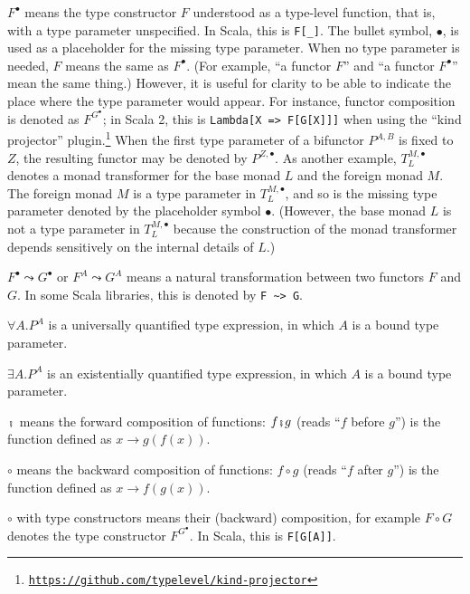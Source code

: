 $F^{\bullet}$ means the type constructor $F$ understood as a type-level
function, \textemdash{} that is, with a type parameter unspecified.
In Scala, this is \lstinline!F[_]!. The bullet symbol, $\bullet$,
is used as a placeholder for the missing type parameter. When no type
parameter is needed, $F$ means the same as $F^{\bullet}$. (For example,
``a functor $F$'' and ``a functor $F^{\bullet}$'' mean the same
thing.) However, it is useful for clarity to be able to indicate the
place where the type parameter would appear. For instance, functor
composition is denoted as $F^{G^{\bullet}}$; in Scala 2, this is
\texttt{}\lstinline!Lambda[X => F[G[X]]]! when using the ``kind
projector'' plugin.\footnote{\texttt{\href{https://github.com/typelevel/kind-projector}{https://github.com/typelevel/kind-projector}}}
When the first type parameter of a bifunctor $P^{A,B}$ is fixed to
$Z$, the resulting functor may be denoted by $P^{Z,\bullet}$. As
another example, $T_{L}^{M,\bullet}$ denotes a monad transformer
for the base monad $L$ and the foreign monad $M$. The foreign monad
$M$ is a type parameter in $T_{L}^{M,\bullet}$, and so is the missing
type parameter denoted by the placeholder symbol $\bullet$. (However,
the base monad $L$ is not a type parameter in $T_{L}^{M,\bullet}$
because the construction of the monad transformer depends sensitively
on the internal details of $L$.)

$F^{\bullet}\leadsto G^{\bullet}$ or $F^{A}\leadsto G^{A}$ means
a natural transformation between two functors $F$ and $G$. In some
Scala libraries, this is denoted by \lstinline!F ~> G!.

$\forall A.P^{A}$ is a universally quantified type expression, in
which $A$ is a bound type parameter.

$\exists A.P^{A}$ is an existentially quantified type expression,
in which $A$ is a bound type parameter.

$\bef$ means the forward composition
of functions: $f\bef g$ (reads ``$f$ before $g$'') is the function
defined as $x\rightarrow g(f(x))$.

$\circ$ means the backward composition
of functions: $f\circ g$ (reads ``$f$ after $g$'') is the function
defined as $x\rightarrow f(g(x))$.

$\circ$ with type constructors means their (backward) composition,
for example $F\circ G$ denotes the type constructor $F^{G^{\bullet}}$.
In Scala, this is \lstinline!F[G[A]]!. 


